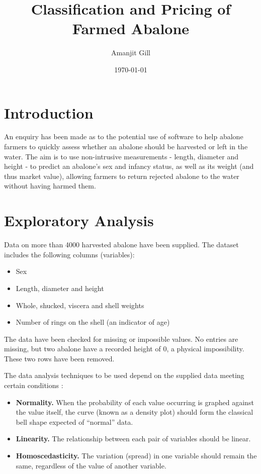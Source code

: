 \documentclass[11pt, a4paper]{article}
\title{\Large\bfseries Classification and Pricing of Farmed Abalone}
\author{\large Amanjit Gill}
\date{\small \today}
\begin{document}
    
    \maketitle

    \section*{Introduction}    
      
    An enquiry has been made as to the potential use of software to help abalone farmers to quickly assess whether an abalone should be harvested or left in the water. The aim is to use non-intrusive measurements - length, diameter and height - to predict an abalone's sex and infancy status, as well as its weight (and thus market value), allowing farmers to return rejected abalone to the water without having harmed them.

    \section{Exploratory Analysis}

    Data on more than 4000 harvested abalone have been supplied. The dataset includes the following columns (variables):

    \begin{itemize}
        \item Sex
        \item Length, diameter and height
        \item Whole, shucked, viscera and shell weights
        \item Number of rings on the shell (an indicator of age)
    \end{itemize}

    The data have been checked for missing or impossible values. No entries are missing, but two abalone have a recorded height of 0, a physical impossibility. These two rows have been removed.

    The data analysis techniques to be used depend on the supplied data meeting certain conditions \parencite{assumptions}:

    \begin{itemize}
        \item \textbf{Normality.} When the probability of each value occurring is graphed against the value itself, the curve (known as a density plot) should form the classical bell shape expected of ``normal'' data.
        \item \textbf{Linearity.} The relationship between each pair of variables should be linear.
        \item \textbf{Homoscedasticity.} The variation (spread) in one variable should remain the same, regardless of the value of another variable. 
    \end{itemize}
\end{document}
